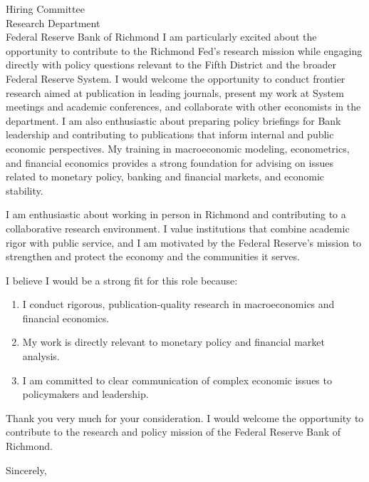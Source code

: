 \documentclass[11pt,letterpaper]{letter}
\begin{document}
\begin{letter}{
Hiring Committee \\
Research Department \\
Federal Reserve Bank of Richmond
}
I am particularly excited about the opportunity to contribute to the Richmond Fed’s research mission while engaging directly with policy questions relevant to the Fifth District and the broader Federal Reserve System. I would welcome the opportunity to conduct frontier research aimed at publication in leading journals, present my work at System meetings and academic conferences, and collaborate with other economists in the department. I am also enthusiastic about preparing policy briefings for Bank leadership and contributing to publications that inform internal and public economic perspectives. My training in macroeconomic modeling, econometrics, and financial economics provides a strong foundation for advising on issues related to monetary policy, banking and financial markets, and economic stability.

I am enthusiastic about working in person in Richmond and contributing to a collaborative research environment. I value institutions that combine academic rigor with public service, and I am motivated by the Federal Reserve’s mission to strengthen and protect the economy and the communities it serves.

I believe I would be a strong fit for this role because:
\begin{enumerate}
    \item I conduct rigorous, publication-quality research in macroeconomics and financial economics.
    \item My work is directly relevant to monetary policy and financial market analysis.
    \item I am committed to clear communication of complex economic issues to policymakers and leadership.
\end{enumerate}

Thank you very much for your consideration. I would welcome the opportunity to contribute to the research and policy mission of the Federal Reserve Bank of Richmond.

\closing{Sincerely,}

\end{letter}
\end{document}
